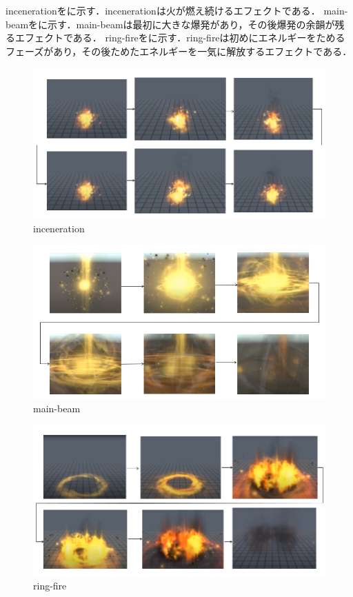 incenerationをに示す．incenerationは火が燃え続けるエフェクトである．
main-beamをに示す．main-beamは最初に大きな爆発があり，その後爆発の余韻が残るエフェクトである．
ring-fireをに示す．ring-fireは初めにエネルギーをためるフェーズがあり，その後ためたエネルギーを一気に解放するエフェクトである．

\begin{figure}[h]
\centering
\includegraphics[clip,width=14cm]{./fig/fireTime.png}
\caption{inceneration}\label{fire}
\end{figure}

\begin{figure}[h]
\centering
\includegraphics[clip,width=14cm]{./fig/mainbeamTime.png}
\caption{main-beam}\label{explosion}
\end{figure}

\begin{figure}[h]
\centering
\includegraphics[clip,width=14cm]{./fig/ringfireTime.png}
\caption{ring-fire}\label{ringfire}
\end{figure}


